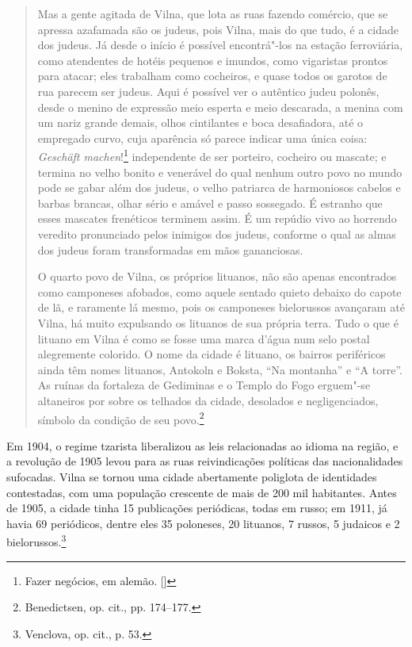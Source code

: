 \begin{quote}
Mas a gente agitada de Vilna, que lota as ruas fazendo comércio, que se
apressa azafamada são os judeus, pois Vilna, mais do que tudo, é a
cidade dos judeus. Já desde o início é possível encontrá"-los na estação
ferroviária, como atendentes de hotéis pequenos e imundos, como
vigaristas prontos para atacar; eles trabalham como cocheiros, e quase
todos os garotos de rua parecem ser judeus. Aqui é possível ver o
autêntico judeu polonês, desde o menino de expressão meio esperta e meio
descarada, a menina com um nariz grande demais, olhos cintilantes e boca
desafiadora, até o empregado curvo, cuja aparência só parece indicar uma
única coisa: \textit{Geschäft machen}!\footnote{Fazer negócios, em alemão. []}
independente de ser porteiro, cocheiro ou mascate; e termina no velho
bonito e venerável do qual nenhum outro povo no mundo pode se gabar além
dos judeus, o velho patriarca de harmoniosos cabelos e barbas brancas,
olhar sério e amável e passo sossegado. É estranho que esses mascates
frenéticos terminem assim. É um repúdio vivo ao horrendo veredito
pronunciado pelos inimigos dos judeus, conforme o qual as almas dos
judeus foram transformadas em mãos gananciosas.

O quarto povo de Vilna, os próprios lituanos, não são apenas encontrados
como camponeses afobados, como aquele sentado quieto debaixo do capote
de lã, e raramente lá mesmo, pois os camponeses bielorussos avançaram até
Vilna, há muito expulsando os lituanos de sua própria terra. Tudo o que
é lituano em Vilna é como se fosse uma marca d'água num selo postal
alegremente colorido. O nome da cidade é lituano, os bairros periféricos
ainda têm nomes lituanos, Antokoln e Boksta, ``Na montanha'' e ``A
torre''. As ruínas da fortaleza de Gediminas e o Templo do Fogo
erguem"-se altaneiros por sobre os telhados da cidade, desolados e
negligenciados, símbolo da condição de seu povo.\footnote{Benedictsen, op. cit., pp. 174--177.} 
\end{quote}

Em 1904, o regime tzarista liberalizou as leis relacionadas ao idioma na
região, e a revolução de 1905 levou para as ruas reivindicações
políticas das nacionalidades sufocadas. Vilna se tornou uma cidade
abertamente poliglota de identidades contestadas, com uma população
crescente de mais de 200 mil habitantes. Antes de 1905, a cidade tinha
15 publicações periódicas, todas em russo; em 1911, já havia 69
periódicos, dentre eles 35 poloneses, 20 lituanos, 7 russos, 5 judaicos
e 2 bielorussos.\footnote{Venclova, op. cit., p. 53.}

